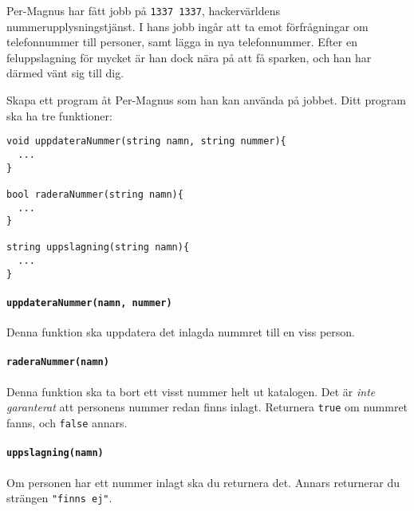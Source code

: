 
Per-Magnus har fått jobb på \texttt{1337 1337}, hackervärldens nummerupplysningstjänst. I hans jobb ingår att ta emot förfrågningar om telefonnummer till personer, samt lägga in nya telefonnummer. Efter en feluppslagning för mycket är han dock nära på att få sparken, och han har därmed vänt sig till dig.

Skapa ett program åt Per-Magnus som han kan använda på jobbet. Ditt program ska ha tre funktioner:

\begin{verbatim}
void uppdateraNummer(string namn, string nummer){
  ...
}

bool raderaNummer(string namn){
  ...
}

string uppslagning(string namn){
  ...
}
\end{verbatim}

\paragraph*{\texttt{uppdateraNummer(namn, nummer)}} Denna funktion ska uppdatera det inlagda nummret till en viss person.

\paragraph*{\texttt{raderaNummer(namn)}} Denna funktion ska ta bort ett visst nummer helt ut katalogen. Det är \emph{inte garanterat} att personens nummer redan finns inlagt. Returnera \texttt{true} om nummret fanns, och \texttt{false} annars.

\paragraph*{\texttt{uppslagning(namn)}}  Om personen har ett nummer inlagt ska du returnera det. Annars returnerar du strängen \texttt{"finns ej"}.
